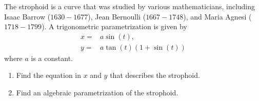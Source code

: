 \begin{exercise}{9}
The strophoid is a curve that was studied by various mathematicians, including Isaac Barrow ($1630-1677$), Jean Bernoulli ($1667-1748$), and Maria Agnesi ($1718-1799$). 
A trigonometric parametrization is given by
\begin{align*}
    x =& a\sin(t),\\
    y =& a\tan(t)( 1 + \sin(t) )
\end{align*}
where $a$ is a constant.
    \begin{enumerate}
        \item Find the equation in $x$ and $y$ that describes the strophoid.
        \item Find an algebraic parametrization of the strophoid.
    \end{enumerate}
\end{exercise}
